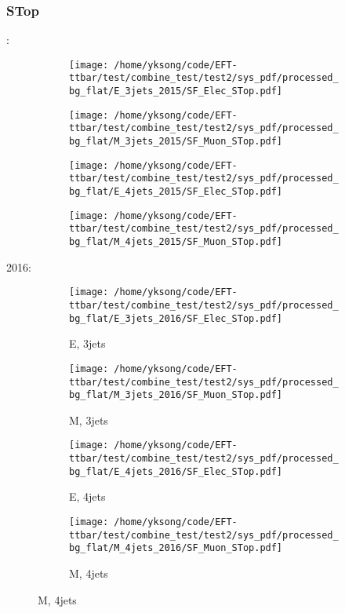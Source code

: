 \documentclass{beamer}
\begin{document}
\begin{frame}
\frametitle{STop}
\fontsize{5}{1}:
\begin{figure}
\centering
\begin{subfigure}[b]{0.24\textwidth}
\texttt{[image: /home/yksong/code/EFT-ttbar/test/combine\_test/test2/sys\_pdf/processed\_bg\_flat/E\_3jets\_2015/SF\_Elec\_STop.pdf]}
\end{subfigure}
\begin{subfigure}[b]{0.24\textwidth}
\texttt{[image: /home/yksong/code/EFT-ttbar/test/combine\_test/test2/sys\_pdf/processed\_bg\_flat/M\_3jets\_2015/SF\_Muon\_STop.pdf]}
\end{subfigure}
\begin{subfigure}[b]{0.24\textwidth}
\texttt{[image: /home/yksong/code/EFT-ttbar/test/combine\_test/test2/sys\_pdf/processed\_bg\_flat/E\_4jets\_2015/SF\_Elec\_STop.pdf]}
\end{subfigure}
\begin{subfigure}[b]{0.24\textwidth}
\texttt{[image: /home/yksong/code/EFT-ttbar/test/combine\_test/test2/sys\_pdf/processed\_bg\_flat/M\_4jets\_2015/SF\_Muon\_STop.pdf]}
\end{subfigure}
\end{figure}
2016:
\begin{figure}
\centering
\begin{subfigure}[b]{0.24\textwidth}
\texttt{[image: /home/yksong/code/EFT-ttbar/test/combine\_test/test2/sys\_pdf/processed\_bg\_flat/E\_3jets\_2016/SF\_Elec\_STop.pdf]}
\captionsetup{font=tiny}
\caption{E, 3jets}
\end{subfigure}
\begin{subfigure}[b]{0.24\textwidth}
\texttt{[image: /home/yksong/code/EFT-ttbar/test/combine\_test/test2/sys\_pdf/processed\_bg\_flat/M\_3jets\_2016/SF\_Muon\_STop.pdf]}
\captionsetup{font=tiny}
\caption{M, 3jets}
\end{subfigure}
\begin{subfigure}[b]{0.24\textwidth}
\texttt{[image: /home/yksong/code/EFT-ttbar/test/combine\_test/test2/sys\_pdf/processed\_bg\_flat/E\_4jets\_2016/SF\_Elec\_STop.pdf]}
\captionsetup{font=tiny}
\caption{E, 4jets}
\end{subfigure}
\begin{subfigure}[b]{0.24\textwidth}
\texttt{[image: /home/yksong/code/EFT-ttbar/test/combine\_test/test2/sys\_pdf/processed\_bg\_flat/M\_4jets\_2016/SF\_Muon\_STop.pdf]}
\captionsetup{font=tiny}
\caption{M, 4jets}
\end{subfigure}
\end{figure}
\end{frame}
\end{document}
